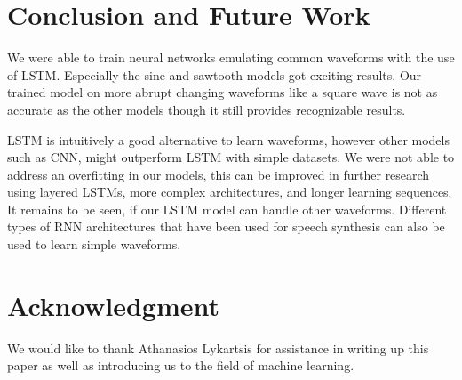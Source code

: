 \documentclass[conference]{IEEEtran}
\begin{document}
\section{Conclusion and Future Work}
We were able to train neural networks emulating common waveforms with the use of LSTM.
Especially the sine and sawtooth models got exciting results.
Our trained model on more abrupt changing waveforms like a square wave is not as accurate as the other models though it still provides recognizable results.

LSTM is intuitively a good alternative to learn waveforms, however other models such as CNN, might outperform LSTM with simple datasets.
We were not able to address an overfitting in our models, this can be improved in further research using layered LSTMs, more complex architectures, and longer learning sequences.
It remains to be seen, if our LSTM model can handle other waveforms. Different types of RNN architectures that have been used for speech synthesis\cite{wu2016merlin} can also be used to learn simple waveforms.

\section*{Acknowledgment}

We would like to thank Athanasios Lykartsis for assistance in writing up this paper as well as introducing us to the field of machine learning.



%
%
\end{document}

